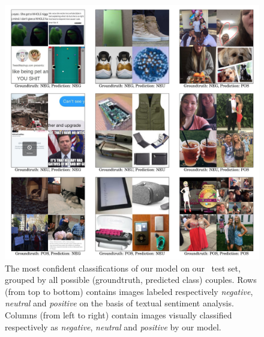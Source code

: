 \begin{figure}
\centering
\includegraphics[width=\linewidth]{confusion-images}
\caption{The most confident classifications of our model on our \BTSA\, test set, grouped by all possible (groundtruth, predicted class) couples. Rows (from top to bottom) contains images labeled respectively \textit{negative}, \textit{neutral} and \textit{positive} on the basis of textual sentiment analysis. Columns (from left to right) contain images visually classified respectively as \textit{negative}, \textit{neutral} and \textit{positive} by our model.
}
\label{fig:vsa:confusion-images}
\end{figure}

